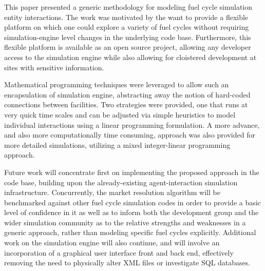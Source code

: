 This paper presented a generic methodology for modeling fuel cycle simulation
entity interactions. The work was motivated by the want to provide a flexible
platform on which one could explore a variety of fuel cycles without requiring
simulation-engine level changes in the underlying code base. Furthermore, this
flexible platform is available as an open source project, allowing any developer
access to the simulation engine while also allowing for cloistered development
at sites with sensitive information. 

Mathematical programming techniques were leveraged to allow such an
encapsulation of simulation engine, abstracting away the notion of hard-coded
connections between facilities. Two strategies were provided, one that runs at
very quick time scales and can be adjusted via simple heuristics to model
individual interactions using a linear programming formulation. A more advance,
and also more computationally time consuming, approach was also provided for
more detailed simulations, utilizing a mixed integer-linear programming
approach.

Future work will concentrate first on implementing the proposed approach in the
\Cyclus code base, building upon the already-existing agent-interaction
simulation infrastructure. Concurrently, the market resolution algorithm will be
benchmarked against other fuel cycle simulation codes in order to provide a
basic level of confidence in it as well as to inform both the \Cyclus
development group and the wider simulation community as to the relative
strengths and weaknesses in a generic approach, rather than modeling specific
fuel cycles explicitly. Additional work on the \Cyclus simulation engine will
also continue, and will involve an incorporation of a graphical user interface
front and back end, effectively removing the need to physically alter XML files
or investigate SQL databases.
